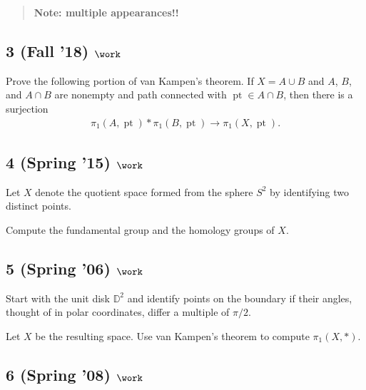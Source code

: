 \begin{quote}
\textbf{Note: multiple appearances!!}
\end{quote}

\hypertarget{fall-18-work-2}{%
\subsection{\texorpdfstring{3 (Fall '18)
\(\work\)}{3 (Fall '18) \textbackslash work}}\label{fall-18-work-2}}

Prove the following portion of van Kampen's theorem. If \(X = A\cup B\)
and \(A\), \(B\), and \(A \cap B\) are nonempty and path connected with
\({\operatorname{pt}}\in A \cap B\), then there is a surjection
\begin{align*}
\pi_1 (A, {\operatorname{pt}}) \ast \pi_1 (B, {\operatorname{pt}}) \to \pi_1 (X, {\operatorname{pt}})
.\end{align*}

\hypertarget{spring-15-work-1}{%
\subsection{\texorpdfstring{4 (Spring '15)
\(\work\)}{4 (Spring '15) \textbackslash work}}\label{spring-15-work-1}}

Let \(X\) denote the quotient space formed from the sphere \(S^2\) by
identifying two distinct points.

Compute the fundamental group and the homology groups of \(X\).

\hypertarget{spring-06-work-2}{%
\subsection{\texorpdfstring{5 (Spring '06)
\(\work\)}{5 (Spring '06) \textbackslash work}}\label{spring-06-work-2}}

Start with the unit disk \({\mathbb{D}}^2\) and identify points on the
boundary if their angles, thought of in polar coordinates, differ a
multiple of \(\pi/2\).

Let \(X\) be the resulting space. Use van Kampen's theorem to compute
\(\pi_1 (X, \ast)\).

\hypertarget{spring-08-work}{%
\subsection{\texorpdfstring{6 (Spring '08)
\(\work\)}{6 (Spring '08) \textbackslash work}}\label{spring-08-work}}

